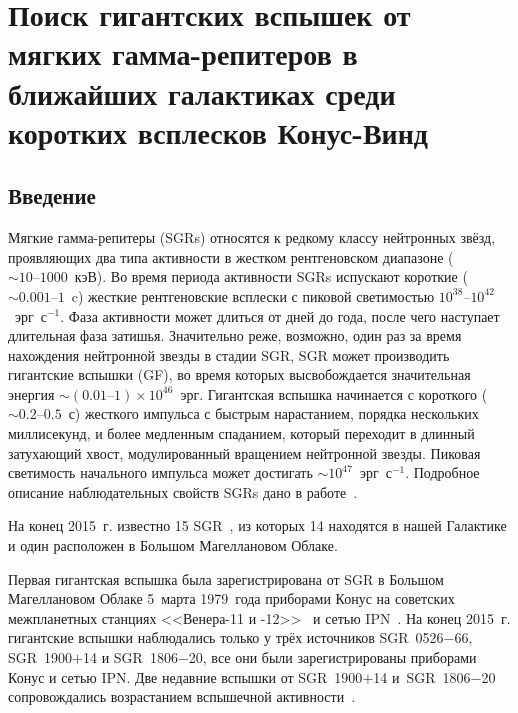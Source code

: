 \chapter{Поиск гигантских вспышек от мягких гамма-репитеров в ближайших галактиках 
         среди коротких всплесков Конус-Винд} \label{SGR_GF_search}

\section{Введение}
Мягкие гамма-репитеры (SGRs) относятся к редкому классу нейтронных звёзд, проявляющих 
два типа активности в жестком рентгеновском диапазоне ($\sim 10\textrm{--}1000$~кэВ). 
Во время периода активности SGRs испускают короткие ($\sim0.001\textrm{--}1$~c) жесткие рентгеновские всплески 
с пиковой светимостью $10^{38}\textrm{--}10^{42}$~эрг~с$^{-1}$. Фаза активности может длиться 
от дней до года, после чего наступает длительная фаза затишья. Значительно реже, 
возможно, один раз за время нахождения нейтронной звезды в стадии SGR, SGR может 
производить гигантские вспышки (GF), во время которых высвобождается значительная 
энергия $\sim(0.01\textrm{--}1)\times 10^{46}$~эрг. Гигантская вспышка начинается 
с короткого ($\sim 0.2\textrm{--}0.5$~с) жесткого импульса с быстрым нарастанием, 
порядка нескольких миллисекунд, и более медленным спаданием, который переходит 
в длинный затухающий хвост, модулированный вращением нейтронной звезды. 
Пиковая светимость начального импульса может достигать $\sim 10^{47}$~эрг~с$^{-1}$.
Подробное описание наблюдательных свойств SGRs дано в работе~\citep{Mereghetti2013}.

На конец 2015~г. известно 15 SGR~\citep{Olausen_Kaspi2014}, из которых 14 
находятся в нашей Галактике и один расположен в Большом Магеллановом Облаке. 

Первая гигантская вспышка была зарегистрирована от SGR в Большом Магеллановом Облаке 
5~марта 1979~года приборами Конус на советских межпланетных станциях 
<<Венера-11 и -12>>~\citep{Golenetskii1979SvAL, Mazets1979} 
и сетью IPN~\citep{Barat1979, Cline1980, Evans1980, Cline1982}. 
На конец 2015~г. гигантские вспышки наблюдались только у трёх источников 
SGR~0526$-$66, SGR~1900$+$14 и SGR~1806$-$20, все они были зарегистрированы 
приборами Конус и сетью IPN. Две недавние вспышки от SGR~1900$+$14 и~SGR~1806$-$20 
сопровождались возрастанием вспышечной активности~\citep{Mazets1999a, Frederiks2007}.

